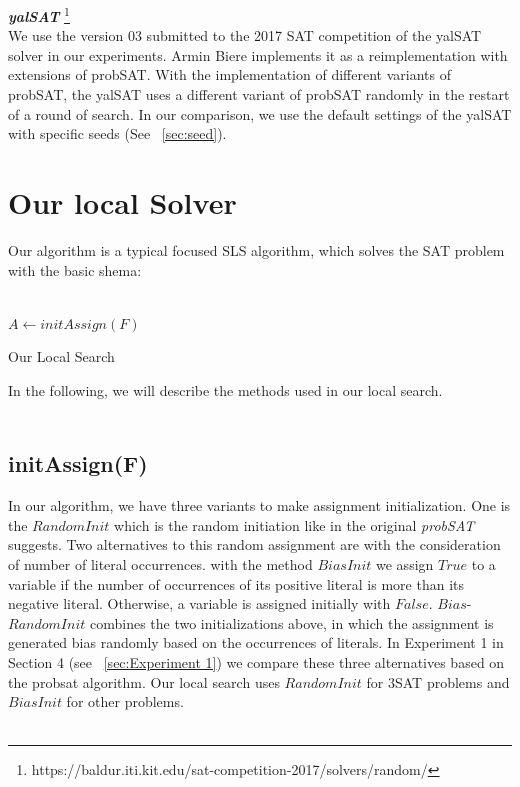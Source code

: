 \documentclass[12pt,a4paper,twoside]{scrartcl}
\numberwithin{equation}{section}
\begin{document}
\emph{\textbf{yalSAT}} \footnote{https://baldur.iti.kit.edu/sat-competition-2017/solvers/random/}\\
We use the version 03 submitted to the 2017 SAT competition of the yalSAT solver in our experiments. Armin Biere implements it as a reimplementation with extensions of probSAT.  With the implementation of different variants of probSAT, the yalSAT uses a different variant of probSAT randomly in the restart of a round of search. In our comparison, we use the default settings of the yalSAT with specific seeds (See ~\ref{sec:seed}).
\clearpage
\section{Our local Solver}
\label{sec:local}
 Our algorithm is a typical focused SLS algorithm, which solves the SAT problem with the basic shema:\\
\\
\begin{algorithm}[H]
  $A \leftarrow initAssign(F)$ \;
 \caption{Our Local Search}
\end{algorithm}
 In the following, we will describe the methods used in our local search.\\
\\
\subsection{initAssign(F)}
In our algorithm, we have three variants to make assignment initialization.
One is the $RandomInit$ which is the random initiation like in the original \emph{probSAT} suggests. Two alternatives to this random assignment are with the consideration of number of literal occurrences. with the method $BiasInit$ we assign $True$ to a variable if the number of occurrences of its positive literal is more than its negative literal. Otherwise, a variable is assigned initially with $False$. $Bias$-$RandomInit$ combines the two initializations above, in which the assignment is generated bias randomly based on the occurrences of literals.  In Experiment 1 in Section 4 (see ~\ref{sec:Experiment 1}) we compare these three alternatives based on the probsat algorithm. Our local search uses $RandomInit$ for 3SAT problems and $BiasInit$ for other problems.\\
\\
\end{document}
